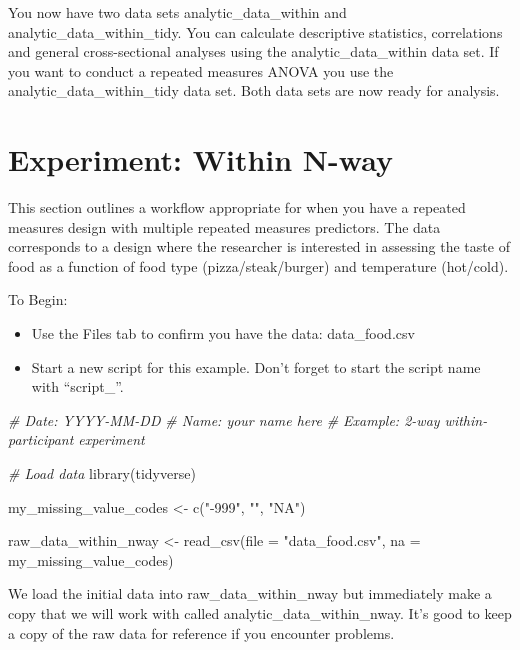 \documentclass[
]{krantz}
\makeatletter
\newenvironment{Shaded}{\begin{snugshade}}{\end{snugshade}}
\newcommand{\AttributeTok}[1]{\textcolor[rgb]{0.61,0.61,0.61}{#1}}
\newcommand{\CommentTok}[1]{\textcolor[rgb]{0.37,0.37,0.37}{\textit{#1}}}
\newcommand{\FunctionTok}[1]{\textcolor[rgb]{0,0,0}{#1}}
\newcommand{\NormalTok}[1]{#1}
\newcommand{\OtherTok}[1]{\textcolor[rgb]{0.37,0.37,0.37}{#1}}
\newcommand{\StringTok}[1]{\textcolor[rgb]{0.5,0.5,0.5}{#1}}
\newenvironment{kframe}{%
\medskip{}
\setlength{\fboxsep}{.8em}
 \def\at@end@of@kframe{}%
 \ifinner\ifhmode%
  \def\at@end@of@kframe{\end{minipage}}%
  \begin{minipage}{\columnwidth}%
 \fi\fi%
 \def\FrameCommand##1{\hskip\@totalleftmargin \hskip-\fboxsep
 \colorbox{shadecolor}{##1}\hskip-\fboxsep
     \hskip-\linewidth \hskip-\@totalleftmargin \hskip\columnwidth}%
 \MakeFramed {\advance\hsize-\width
   \@totalleftmargin\z@ \linewidth\hsize
   \@setminipage}}%
 {\par\unskip\endMakeFramed%
 \at@end@of@kframe}
\renewenvironment{Shaded}{\begin{kframe}}{\end{kframe}}
\makeatother
\begin{document}
You now have two data sets analytic\_data\_within and analytic\_data\_within\_tidy. You can calculate descriptive statistics, correlations and general cross-sectional analyses using the analytic\_data\_within data set. If you want to conduct a repeated measures ANOVA you use the analytic\_data\_within\_tidy data set. Both data sets are now ready for analysis.

\hypertarget{experiment-within-n-way}{%
\section{Experiment: Within N-way}\label{experiment-within-n-way}}

This section outlines a workflow appropriate for when you have a repeated measures design with multiple repeated measures predictors. The data corresponds to a design where the researcher is interested in assessing the taste of food as a function of food type (pizza/steak/burger) and temperature (hot/cold).

To Begin:

\begin{itemize}
\item
  Use the Files tab to confirm you have the data: data\_food.csv
\item
  Start a new script for this example. Don't forget to start the script name with ``script\_''.
\end{itemize}

\begin{Shaded}
\begin{Highlighting}[]
\CommentTok{\# Date: YYYY{-}MM{-}DD}
\CommentTok{\# Name: your name here}
\CommentTok{\# Example: 2{-}way within{-}participant experiment}

\CommentTok{\# Load data}
\FunctionTok{library}\NormalTok{(tidyverse)}

\NormalTok{my\_missing\_value\_codes }\OtherTok{\textless{}{-}} \FunctionTok{c}\NormalTok{(}\StringTok{"{-}999"}\NormalTok{, }\StringTok{""}\NormalTok{, }\StringTok{"NA"}\NormalTok{)}

\NormalTok{raw\_data\_within\_nway }\OtherTok{\textless{}{-}} \FunctionTok{read\_csv}\NormalTok{(}\AttributeTok{file =} \StringTok{"data\_food.csv"}\NormalTok{,}
                     \AttributeTok{na =}\NormalTok{ my\_missing\_value\_codes)}
\end{Highlighting}
\end{Shaded}

We load the initial data into raw\_data\_within\_nway but immediately make a copy that we will work with called analytic\_data\_within\_nway. It's good to keep a copy of the raw data for reference if you encounter problems.
\end{document}
